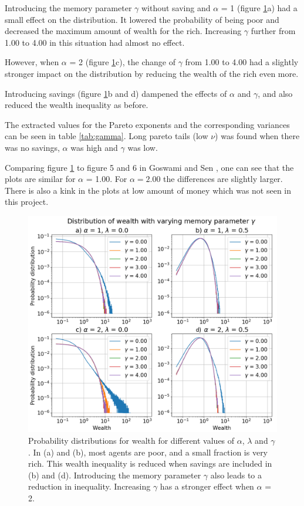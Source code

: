 \documentclass[11pt,a4paper,titlepage]{article}
\begin{document}
Introducing the memory parameter $\gamma$ without saving and $\alpha$ = 1 (figure \ref{fig:task_e_gamma}a) had a small effect on the distribution. It lowered the probability of being poor and decreased the maximum amount of wealth for the rich. Increasing $\gamma$ further from 1.00 to 4.00 in this situation had almost no effect. 

However, when $\alpha$ = 2 (figure \ref{fig:task_e_gamma}c), the change of $\gamma$ from 1.00 to 4.00 had a slightly stronger impact on the distribution by reducing the wealth of the rich even more. 

Introducing savings (figure \ref{fig:task_e_gamma}b and d) dampened the effects of $\alpha$ and $\gamma$, and also reduced the wealth inequality as before.

The extracted values for the Pareto exponents and the corresponding variances can be seen in table \ref{tab:gamma}. Long pareto tails (low $\nu$) was found when there was no savings, $\alpha$ was high and $\gamma$ was low.

Comparing figure \ref{fig:task_e_gamma} to figure 5 and 6 in Goswami and Sen \cite{Goswami}, one can see that the plots are similar for $\alpha$ = 1.00. For $\alpha = 2.00$ the differences are slightly larger. There is also a kink in the plots at low amount of money which was not seen in this project.

\begin{figure}[ht!]
\centering
\includegraphics[scale=0.4]{task_e_gamma.png}
\caption{Probability distributions for wealth for different values of $\alpha$, $\lambda$ and $\gamma$. In (a) and (b), most agents are poor, and a small fraction is very rich. This wealth inequality is reduced when savings are included in (b) and (d). Introducing the memory parameter $\gamma$ also leads to a reduction in inequality. Increasing $\gamma$ has a stronger effect when $\alpha$ = 2.    \label{fig:task_e_gamma}}
\end{figure}
\end{document}
